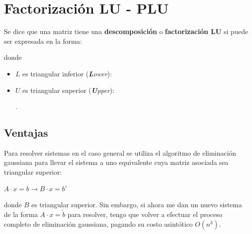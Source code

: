 \documentclass[]{article}
\begin{document}
\section{Factorización LU - PLU}
Se dice que una matriz tiene una \textbf{descomposición} o \textbf{factorización LU} si puede ser expresada en la forma:
\begin{center}
\end{center}
donde
\begin{itemize}
	\item $L$ es triangular inferior (\emph{\textbf{L}ower}):
	\begin{center}
	\end{center}
	\item $U$ es triangular superior (\emph{\textbf{U}pper}):
	\begin{center}
		.
	\end{center}
\end{itemize}

\subsection{Ventajas}
Para resolver sistemas en el caso general se utiliza el algoritmo de eliminación gaussiana para llevar el sistema a uno equivalente cuya matriz asociada sea triangular superior:
\begin{center}
	$A\cdot x = b \longrightarrow B\cdot x = b'$
\end{center}
donde $B$ es triangular superior. Sin embargo, si ahora me dan un nuevo sistema de la forma $A\cdot x = \tilde b$ para resolver, tengo que volver a efectuar el proceso completo de eliminación gaussiana, pagando su costo asintótico $O(n^3)$.
\end{document}
